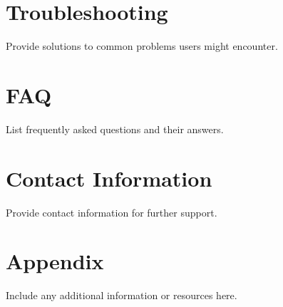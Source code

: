 \documentclass[aps,preprint]{revtex4-1}
\begin{document}
\section{Troubleshooting}
Provide solutions to common problems users might encounter.

\section{FAQ}
List frequently asked questions and their answers.

\section{Contact Information}
Provide contact information for further support.

\appendix
\section{Appendix}
Include any additional information or resources here.



\end{document}
